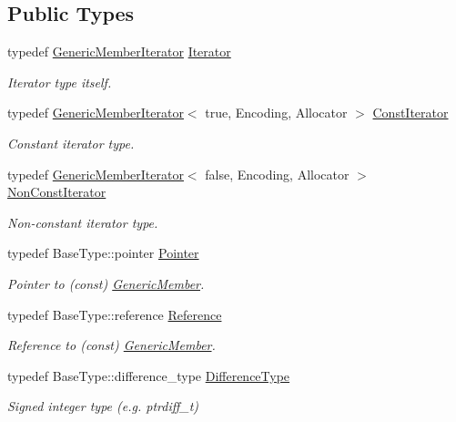 \subsection*{Public Types}
\begin{DoxyCompactItemize}
\item 
\mbox{\label{a02004_ad1cf1ecf6210b47906c9f179c893a8b8}} 
typedef \hyperlink{a02004}{Generic\+Member\+Iterator} \hyperlink{a02004_ad1cf1ecf6210b47906c9f179c893a8b8}{Iterator}
\begin{DoxyCompactList}\small\item\em Iterator type itself. \end{DoxyCompactList}\item 
\mbox{\label{a02004_ae5be27a73dce0be58ee2776db896d591}} 
typedef \hyperlink{a02004}{Generic\+Member\+Iterator}$<$ true, Encoding, Allocator $>$ \hyperlink{a02004_ae5be27a73dce0be58ee2776db896d591}{Const\+Iterator}
\begin{DoxyCompactList}\small\item\em Constant iterator type. \end{DoxyCompactList}\item 
\mbox{\label{a02004_abc26eb06f2962765b11dcd06ce84ac02}} 
typedef \hyperlink{a02004}{Generic\+Member\+Iterator}$<$ false, Encoding, Allocator $>$ \hyperlink{a02004_abc26eb06f2962765b11dcd06ce84ac02}{Non\+Const\+Iterator}
\begin{DoxyCompactList}\small\item\em Non-\/constant iterator type. \end{DoxyCompactList}\item 
\mbox{\label{a02004_ac69f141f1fde31c1f550f524a69c5de9}} 
typedef Base\+Type\+::pointer \hyperlink{a02004_ac69f141f1fde31c1f550f524a69c5de9}{Pointer}
\begin{DoxyCompactList}\small\item\em Pointer to (const) \hyperlink{a02000}{Generic\+Member}. \end{DoxyCompactList}\item 
\mbox{\label{a02004_ae80f6b601eb9e24f73aa75fb32b35c65}} 
typedef Base\+Type\+::reference \hyperlink{a02004_ae80f6b601eb9e24f73aa75fb32b35c65}{Reference}
\begin{DoxyCompactList}\small\item\em Reference to (const) \hyperlink{a02000}{Generic\+Member}. \end{DoxyCompactList}\item 
\mbox{\label{a02004_a902b99c8ae351cd7626514dc5f30740a}} 
typedef Base\+Type\+::difference\+\_\+type \hyperlink{a02004_a902b99c8ae351cd7626514dc5f30740a}{Difference\+Type}
\begin{DoxyCompactList}\small\item\em Signed integer type (e.\+g. {\ttfamily ptrdiff\+\_\+t}) \end{DoxyCompactList}\end{DoxyCompactItemize}
